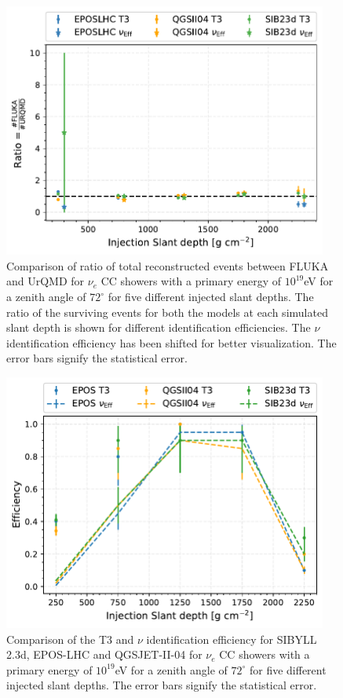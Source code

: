 \begin{figure}[t!]
  \centering
  \includegraphics[width=0.95\textwidth]{thesis_figures/App2/Efficiency_vs_slant_comp_FLUKAnURQMD.pdf}
  \caption{Comparison of ratio of total reconstructed events between FLUKA and UrQMD for $\nu_e$ CC showers with a primary energy of $10^{19}$eV for a zenith angle of $72^\circ$ for five different injected slant depths. The ratio of the surviving events for both the models at each simulated slant depth is shown for different identification efficiencies. The $\nu$ identification efficiency has been shifted for better visualization. The error bars signify the statistical error.}
  \label{fig:Efficiency_vs_slant_comp_FLUKAnURQMD}
\end{figure}

\begin{figure}[h!]
  \centering
  \includegraphics[width=0.95\textwidth]{thesis_figures/App2/Efficiency_vs_slant_comp_all_HModel.pdf}
  \caption{Comparison of the T3 and $\nu$ identification efficiency for SIBYLL 2.3d, EPOS-LHC and QGSJET-II-04 for $\nu_e$ CC showers with a primary energy of $10^{19}$eV for a zenith angle of $72^\circ$ for five different injected slant depths. The error bars signify the statistical error.}
  \label{fig:Eff_vs_slant_comp_all_HModels}
\end{figure}


